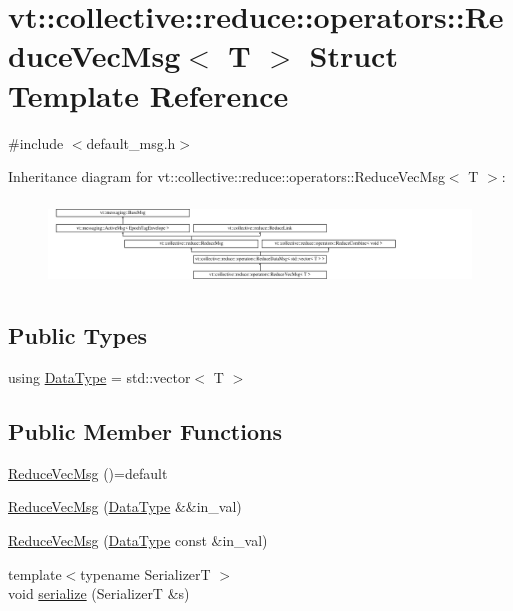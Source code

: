 \hypertarget{structvt_1_1collective_1_1reduce_1_1operators_1_1_reduce_vec_msg}{}\section{vt\+:\+:collective\+:\+:reduce\+:\+:operators\+:\+:Reduce\+Vec\+Msg$<$ T $>$ Struct Template Reference}
\label{structvt_1_1collective_1_1reduce_1_1operators_1_1_reduce_vec_msg}


{\ttfamily \#include $<$default\+\_\+msg.\+h$>$}

Inheritance diagram for vt\+:\+:collective\+:\+:reduce\+:\+:operators\+:\+:Reduce\+Vec\+Msg$<$ T $>$\+:\begin{figure}[H]
\begin{center}
\leavevmode
\includegraphics[height=2.287582cm]{structvt_1_1collective_1_1reduce_1_1operators_1_1_reduce_vec_msg}
\end{center}
\end{figure}
\subsection*{Public Types}
\begin{DoxyCompactItemize}
\item 
using \hyperlink{structvt_1_1collective_1_1reduce_1_1operators_1_1_reduce_vec_msg_a556927389ef91ea8f5a7892501724a37}{Data\+Type} = std\+::vector$<$ T $>$
\end{DoxyCompactItemize}
\subsection*{Public Member Functions}
\begin{DoxyCompactItemize}
\item 
\hyperlink{structvt_1_1collective_1_1reduce_1_1operators_1_1_reduce_vec_msg_a3e167018ff1d8a0a4bf85843705b737d}{Reduce\+Vec\+Msg} ()=default
\item 
\hyperlink{structvt_1_1collective_1_1reduce_1_1operators_1_1_reduce_vec_msg_a6be0b12305ea5f7ddcf792b903686dcc}{Reduce\+Vec\+Msg} (\hyperlink{structvt_1_1collective_1_1reduce_1_1operators_1_1_reduce_vec_msg_a556927389ef91ea8f5a7892501724a37}{Data\+Type} \&\&in\+\_\+val)
\item 
\hyperlink{structvt_1_1collective_1_1reduce_1_1operators_1_1_reduce_vec_msg_a5d374c7e9b8b04aea7aff6d333ac5907}{Reduce\+Vec\+Msg} (\hyperlink{structvt_1_1collective_1_1reduce_1_1operators_1_1_reduce_vec_msg_a556927389ef91ea8f5a7892501724a37}{Data\+Type} const \&in\+\_\+val)
\item 
{\footnotesize template$<$typename SerializerT $>$ }\\void \hyperlink{structvt_1_1collective_1_1reduce_1_1operators_1_1_reduce_vec_msg_a61a7c876f69e2eed53d6cf73674c4b8c}{serialize} (SerializerT \&s)
\end{DoxyCompactItemize}
